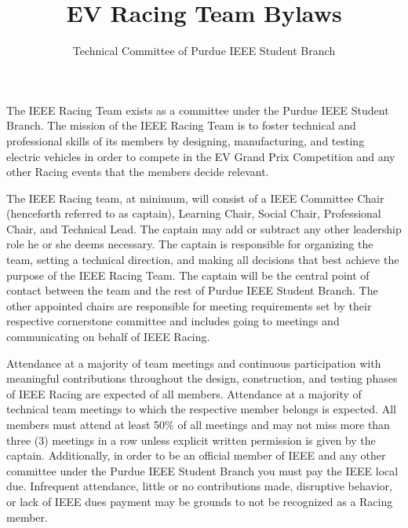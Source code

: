\documentclass[12pt]{constitution}
\title{EV Racing Team Bylaws}
\author{Technical Committee of Purdue IEEE Student Branch}
\date{}
\begin{document}

\titlecontentspage
\newpage


\label{art:preamble}

The IEEE Racing Team exists as a committee under the Purdue IEEE Student Branch. The mission of the IEEE Racing Team is to foster technical and professional skills of its members by designing, manufacturing, and testing electric vehicles in order to compete in the EV Grand Prix Competition and any other Racing events that the members decide relevant.

\label{art:memlead}

The IEEE Racing team, at minimum, will consist of a IEEE Committee Chair (henceforth referred to as captain), Learning Chair, Social Chair, Professional Chair, and Technical Lead. The captain may add or subtract any other leadership role he or she deems necessary. The captain is responsible for organizing the team, setting a technical direction, and making all decisions that best achieve the purpose of the IEEE Racing Team. The captain will be the central point of contact between the team and the rest of Purdue IEEE Student Branch. The other appointed chairs are responsible for meeting requirements set by their respective cornerstone committee and includes going to meetings and communicating on behalf of IEEE Racing.

Attendance at a majority of team meetings and continuous participation with meaningful contributions throughout the design, construction, and testing phases of IEEE Racing are expected of all members. Attendance at a majority of technical team meetings to which the respective member belongs is expected.  All members must attend at least 50\% of all meetings and may not miss more than three (3) meetings in a row unless explicit written permission is given by the captain. Additionally, in order to be an official member of IEEE and any other committee under the Purdue IEEE Student Branch you must pay the IEEE local due. Infrequent attendance, little or no contributions made, disruptive behavior, or lack of IEEE dues payment may be grounds to not be recognized as a Racing member.
\end{document}

